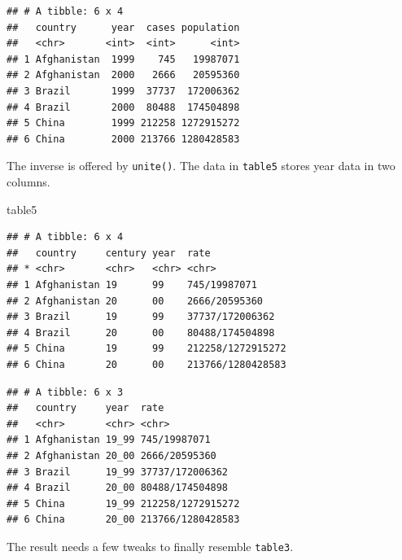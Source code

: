 \documentclass[]{book}
\newenvironment{Shaded}{}{}
\newcommand{\DataTypeTok}[1]{#1}
\newcommand{\KeywordTok}[1]{\textcolor[rgb]{0.00,0.00,1.00}{#1}}
\newcommand{\NormalTok}[1]{#1}
\newcommand{\OperatorTok}[1]{#1}
\newcommand{\StringTok}[1]{\textcolor[rgb]{0.00,0.50,0.50}{#1}}
\begin{document}
\begin{verbatim}
## # A tibble: 6 x 4
##   country      year  cases population
##   <chr>       <int>  <int>      <int>
## 1 Afghanistan  1999    745   19987071
## 2 Afghanistan  2000   2666   20595360
## 3 Brazil       1999  37737  172006362
## 4 Brazil       2000  80488  174504898
## 5 China        1999 212258 1272915272
## 6 China        2000 213766 1280428583
\end{verbatim}

The inverse is offered by \texttt{unite()}.
The data in \texttt{table5} stores year data in two columns.

\begin{Shaded}
\begin{Highlighting}[]
\NormalTok{table5}
\end{Highlighting}
\end{Shaded}

\begin{verbatim}
## # A tibble: 6 x 4
##   country     century year  rate             
## * <chr>       <chr>   <chr> <chr>            
## 1 Afghanistan 19      99    745/19987071     
## 2 Afghanistan 20      00    2666/20595360    
## 3 Brazil      19      99    37737/172006362  
## 4 Brazil      20      00    80488/174504898  
## 5 China       19      99    212258/1272915272
## 6 China       20      00    213766/1280428583
\end{verbatim}

\begin{Shaded}
\end{Shaded}

\begin{verbatim}
## # A tibble: 6 x 3
##   country     year  rate             
##   <chr>       <chr> <chr>            
## 1 Afghanistan 19_99 745/19987071     
## 2 Afghanistan 20_00 2666/20595360    
## 3 Brazil      19_99 37737/172006362  
## 4 Brazil      20_00 80488/174504898  
## 5 China       19_99 212258/1272915272
## 6 China       20_00 213766/1280428583
\end{verbatim}

The result needs a few tweaks to finally resemble \texttt{table3}.

\begin{Shaded}
\end{Shaded}
\end{document}

